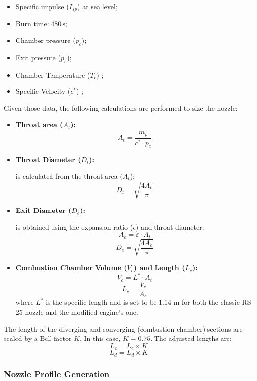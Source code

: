 \begin{itemize}
    \item Specific impulse (\(I_{sp}\)) at sea level;
    \item Burn time: \(480 \, \text{s}\);
    \item Chamber pressure (\(p_c\));
    \item Exit pressure (\(p_e\));
    \item Chamber Temperature (\(T_c\)) ;
    \item Specific Velocity (\(c^*\)) ;

\end{itemize}
Given those data, the following calculations are performed to size the nozzle:
        \begin{itemize}
        \item\textbf {Throat area (\(A_t\)):}
        \[
A_t = \frac{\dot{m}_p}{c^* \cdot p_c}
\]
            \item\textbf {Throat Diameter (\(D_t\)):} 
            
            is calculated from the throat area (\(A_t\)):
            \[
            D_t = \sqrt{\frac{4 A_t}{\pi}}
            \]
            
            \item \textbf{Exit Diameter (\(D_e\)):}
            
            is obtained using the expansion ratio (\(\epsilon\)) and throat diameter:
            \[
            A_e = \varepsilon \cdot A_t
            \]
            \[
            D_e = \sqrt{\frac{4 A_e}{\pi}}
            \]
            
            \item \textbf{Combustion Chamber Volume (\(V_c\)) and Length (\(L_c\)):}
            \[
            V_c = L^* \cdot A_t
            \]
            \[
            L_c = \frac{V_c}{A_c}
            \]
            where \(L^*\) is the specific length and is set to be 1.14 m for both the classic RS-25 nozzle and the modified engine's one.
    \end{itemize}
              The length of the diverging and converging (combustion chamber) sections are scaled by a Bell factor \(K\). In this case, \(K = 0.75\). The adjusted lengths are:
    \[
    L_c = L_c \times K
    \]
    \[
    L_d = L_d \times K
    \]

\subsubsection{Nozzle Profile Generation}

